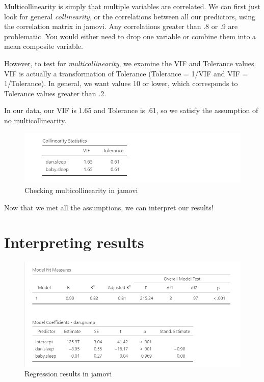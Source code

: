 \documentclass[
]{book}
\begin{document}
Multicollinearity is simply that multiple variables are correlated. We can first just look for general \emph{collinearity}, or the correlations between all our predictors, using the correlation matrix in jamovi. Any correlations greater than .8 or .9 are problematic. You would either need to drop one variable or combine them into a mean composite variable.

However, to test for \emph{multicollinearity}, we examine the VIF and Tolerance values. VIF is actually a transformation of Tolerance (Tolerance = 1/VIF and VIF = 1/Tolerance). In general, we want values 10 or lower, which corresponds to Tolerance values greater than .2.

In our data, our VIF is 1.65 and Tolerance is .61, so we satisfy the assumption of no multicollinearity.

\begin{figure}

{\centering \includegraphics[width=1\linewidth]{images/13-regression/regression-multicollinearity} 

}

\caption{Checking multicollinearity in jamovi}\label{fig:unnamed-chunk-10}
\end{figure}

Now that we met all the assumptions, we can interpret our results!

\hypertarget{interpreting-results-8}{%
\section{Interpreting results}\label{interpreting-results-8}}

\begin{figure}

{\centering \includegraphics[width=1\linewidth]{images/13-regression/regression-results} 

}

\caption{Regression results in jamovi}\label{fig:unnamed-chunk-11}
\end{figure}
\end{document}
